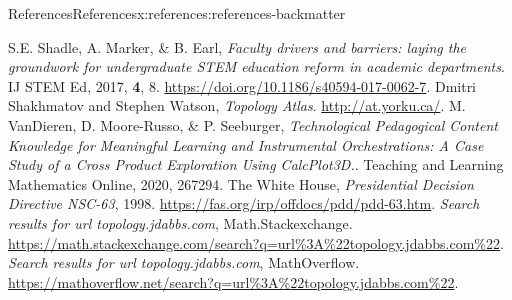 \documentclass[oneside,10pt,]{article}
\begin{document}
\begin{references-section-numberless}{References}{}{References}{}{}{x:references:references-backmatter}
\begin{referencelist}
\hypertarget{x:biblio:biblio-logistics}{}S.E. Shadle, A. Marker, \& B. Earl, \textit{Faculty drivers and barriers: laying the groundwork for undergraduate STEM education reform in academic departments}. IJ STEM Ed, 2017, \textbf{4}, 8. \url{https://doi.org/10.1186/s40594-017-0062-7}.
\hypertarget{x:biblio:biblio-atlas}{}Dmitri Shakhmatov and Stephen Watson, \textit{Topology Atlas}. \url{http://at.yorku.ca/}.
\hypertarget{x:biblio:biblio-calcplot3d}{}M. VanDieren, D. Moore-Russo, \& P. Seeburger, \textit{Technological Pedagogical Content Knowledge for Meaningful Learning and Instrumental Orchestrations: A Case Study of a Cross Product Exploration Using CalcPlot3D.}. Teaching and Learning Mathematics Online, 2020, 267\textendash{}294.
\hypertarget{x:biblio:biblio-prez}{}The White House, \textit{Presidential Decision Directive NSC-63}, 1998. \url{https://fas.org/irp/offdocs/pdd/pdd-63.htm}.
\hypertarget{x:biblio:biblio-mathse-search}{}\textit{Search results for url topology.jdabbs.com}, Math.Stackexchange. \url{https://math.stackexchange.com/search?q=url\%3A\%22topology.jdabbs.com\%22}.
\hypertarget{x:biblio:biblio-mo-search}{}\textit{Search results for url topology.jdabbs.com}, MathOverflow. \url{https://mathoverflow.net/search?q=url\%3A\%22topology.jdabbs.com\%22}.
\end{referencelist}
\end{references-section-numberless}
\end{document}
